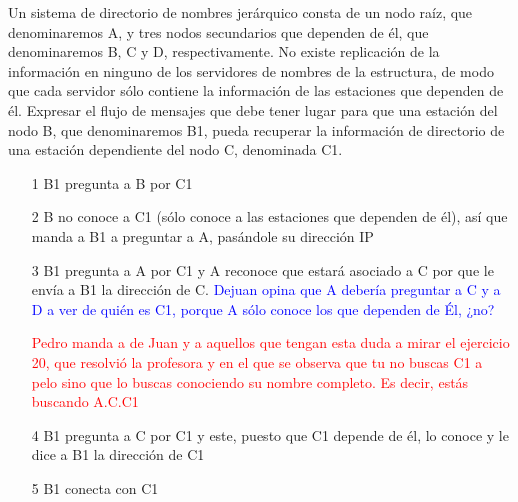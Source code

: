   \begin{problem}[10]
  Un sistema de directorio de nombres jerárquico consta de un nodo raíz, que
denominaremos A, y tres nodos secundarios que dependen de él, que denominaremos
B, C y D, respectivamente. No existe replicación de la información en ninguno
de los servidores de nombres de la estructura, de modo que cada servidor sólo
contiene la información de las estaciones que dependen de él. Expresar el flujo
de mensajes que debe tener lugar para que una estación del nodo B, que
denominaremos B1, pueda recuperar la información de directorio de una estación
dependiente del nodo C, denominada C1.
  \solution

  \yoP

  \begin{enumerate}
  \item[1] B1 pregunta a B por C1
  \item[2] B no conoce a C1 (sólo conoce a las estaciones que dependen de él), así que manda a B1 a preguntar a A, pasándole su dirección IP

  \item[3] B1 pregunta a A por C1 y A reconoce que estará asociado a C por que le envía a B1 la dirección de C. \textcolor{blue}{Dejuan opina que A debería preguntar a C y a D a ver de quién es C1, porque A sólo conoce los que dependen de Él, ¿no?}

  \textcolor{red}{Pedro manda a de Juan y a aquellos que tengan esta duda a mirar el ejercicio 20, que resolvió la profesora y en el que se observa que tu no buscas C1 a pelo sino que lo buscas conociendo su nombre completo. Es decir, estás buscando A.C.C1}

  \item[4] B1 pregunta a C por C1 y este, puesto que C1 depende de él, lo conoce y le dice a B1 la dirección de C1
  \item[5] B1 conecta con C1
  \end{enumerate}

  \end{problem}

